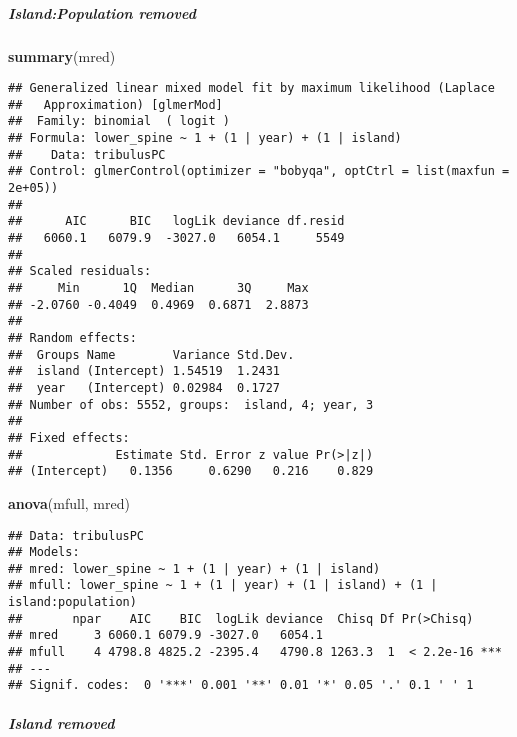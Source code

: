 \documentclass[
]{article}
\newenvironment{Shaded}{\begin{snugshade}}{\end{snugshade}}
\newcommand{\KeywordTok}[1]{\textcolor[rgb]{0.13,0.29,0.53}{\textbf{#1}}}
\newcommand{\NormalTok}[1]{#1}
\begin{document}
\hypertarget{islandpopulation-removed}{%
\subparagraph{Island:Population
removed}\label{islandpopulation-removed}}

\begin{Shaded}
\begin{Highlighting}[]
\KeywordTok{summary}\NormalTok{(mred)}
\end{Highlighting}
\end{Shaded}

\begin{verbatim}
## Generalized linear mixed model fit by maximum likelihood (Laplace
##   Approximation) [glmerMod]
##  Family: binomial  ( logit )
## Formula: lower_spine ~ 1 + (1 | year) + (1 | island)
##    Data: tribulusPC
## Control: glmerControl(optimizer = "bobyqa", optCtrl = list(maxfun = 2e+05))
## 
##      AIC      BIC   logLik deviance df.resid 
##   6060.1   6079.9  -3027.0   6054.1     5549 
## 
## Scaled residuals: 
##     Min      1Q  Median      3Q     Max 
## -2.0760 -0.4049  0.4969  0.6871  2.8873 
## 
## Random effects:
##  Groups Name        Variance Std.Dev.
##  island (Intercept) 1.54519  1.2431  
##  year   (Intercept) 0.02984  0.1727  
## Number of obs: 5552, groups:  island, 4; year, 3
## 
## Fixed effects:
##             Estimate Std. Error z value Pr(>|z|)
## (Intercept)   0.1356     0.6290   0.216    0.829
\end{verbatim}

\begin{Shaded}
\begin{Highlighting}[]
\KeywordTok{anova}\NormalTok{(mfull, mred)}
\end{Highlighting}
\end{Shaded}

\begin{verbatim}
## Data: tribulusPC
## Models:
## mred: lower_spine ~ 1 + (1 | year) + (1 | island)
## mfull: lower_spine ~ 1 + (1 | year) + (1 | island) + (1 | island:population)
##       npar    AIC    BIC  logLik deviance  Chisq Df Pr(>Chisq)    
## mred     3 6060.1 6079.9 -3027.0   6054.1                         
## mfull    4 4798.8 4825.2 -2395.4   4790.8 1263.3  1  < 2.2e-16 ***
## ---
## Signif. codes:  0 '***' 0.001 '**' 0.01 '*' 0.05 '.' 0.1 ' ' 1
\end{verbatim}

\hypertarget{island-removed}{%
\subparagraph{Island removed}\label{island-removed}}
\end{document}
